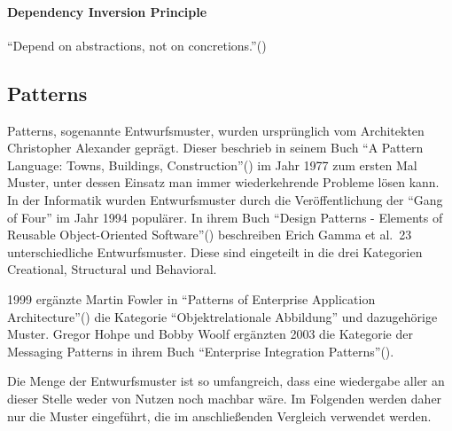 \paragraph{Dependency Inversion Principle}
\enquote{Depend on abstractions, not on concretions.}(\cite{solid})

\subsection{Patterns}
Patterns, sogenannte Entwurfsmuster, wurden ursprünglich vom Architekten Christopher Alexander geprägt.
Dieser beschrieb in seinem Buch \enquote{A Pattern Language: Towns, Buildings, Construction}(\cite{a-pattern-language}) im Jahr 1977 zum ersten Mal Muster, unter dessen Einsatz man immer wiederkehrende Probleme lösen kann.
In der Informatik wurden Entwurfsmuster durch die Veröffentlichung der \enquote{Gang of Four} im Jahr 1994 populärer.
In ihrem Buch \enquote{Design Patterns - Elements of Reusable Object-Oriented Software}(\cite{gamma-design-patterns}) beschreiben Erich Gamma et al.\ 23 unterschiedliche Entwurfsmuster.
Diese sind eingeteilt in die drei Kategorien Creational, Structural und Behavioral.

1999 ergänzte Martin Fowler in \enquote{Patterns of Enterprise Application Architecture}(\cite{patterns-of-enterprise-application-architecture}) die Kategorie \enquote{Objektrelationale Abbildung} und dazugehörige Muster.
Gregor Hohpe und Bobby Woolf ergänzten 2003 die Kategorie der Messaging Patterns in ihrem Buch \enquote{Enterprise Integration Patterns}(\cite{enterprise-integration-patterns}).

Die Menge der Entwurfsmuster ist so umfangreich, dass eine wiedergabe aller an dieser Stelle weder von Nutzen noch machbar wäre.
Im Folgenden werden daher nur die Muster eingeführt, die im anschließenden Vergleich verwendet werden.
